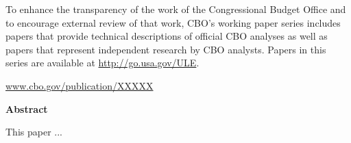 \documentclass[letterpaper,12pt]{article}
\numberwithin{equation}{section}
\numberwithin{figure}{section}
\numberwithin{table}{section}
\begin{document}
\vspace*{\fill}

\begin{flushleft}
	\small To enhance the transparency of the work of the Congressional Budget Office and to encourage external review of that work, CBO's working paper series includes papers that provide technical descriptions of official CBO analyses as well as papers that represent independent research by CBO analysts. Papers in this series are available at \url{http://go.usa.gov/ULE}.
\end{flushleft}

\vspace{1em}

\begin{center}
	\url{www.cbo.gov/publication/XXXXX}
\end{center}




\newpage

\begin{center}
\textbf{Abstract}\\
\end{center}

\noindent This paper ...
\\


\newpage

\pagestyle{plain}
\setcounter{page}{1}
\end{document}
